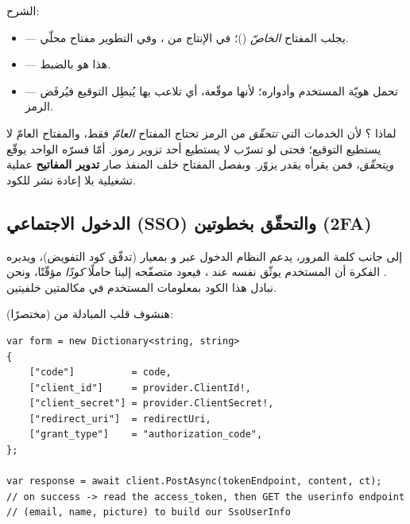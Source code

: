 الشرح:
\begin{itemize}
\item {} — يجلب المفتاح \emph{الخاصّ}
  ()؛ في الإنتاج من ، وفي التطوير مفتاح محلّي.
\item {} — هذا هو  بالضبط.
\item {} — تحمل هويّة المستخدم وأدواره؛ لأنها موقّعة، أي تلاعب بها يُبطِل
  التوقيع فيُرفَض الرمز.
\end{itemize}

\begin{why}
لماذا ؟ لأن الخدمات التي \emph{تتحقّق} من الرمز تحتاج المفتاح
\emph{العامّ} فقط، والمفتاح العامّ لا يستطيع التوقيع؛ فحتى لو تسرّب لا يستطيع أحد
تزوير رموز. أمّا  فسرّه الواحد يوقّع \emph{ويتحقّق}، فمن يقرأه يقدر يزوّر.
وبفصل المفتاح خلف المنفذ  صار \textbf{تدوير المفاتيح} عملية
تشغيلية بلا إعادة نشر للكود.
\end{why}

\subsection{الدخول الاجتماعي (SSO) والتحقّق بخطوتين (2FA)}

إلى جانب كلمة المرور، يدعم النظام الدخول عبر  و بمعيار
 (تدفّق كود التفويض)، ويديره . الفكرة أن المستخدم
يوثّق نفسه عند ، فيعود متصفّحه إلينا حاملًا \emph{كودًا} مؤقّتًا، ونحن
نبادل هذا الكود بمعلومات المستخدم في مكالمتين خلفيتين.

هنشوف قلب المبادلة من  (مختصرًا):

\begin{english}
\begin{lstlisting}[language={[Sharp]C}]
var form = new Dictionary<string, string>
{
    ["code"]          = code,
    ["client_id"]     = provider.ClientId!,
    ["client_secret"] = provider.ClientSecret!,
    ["redirect_uri"]  = redirectUri,
    ["grant_type"]    = "authorization_code",
};

var response = await client.PostAsync(tokenEndpoint, content, ct);
// on success -> read the access_token, then GET the userinfo endpoint
// (email, name, picture) to build our SsoUserInfo
\end{lstlisting}
\end{english}

